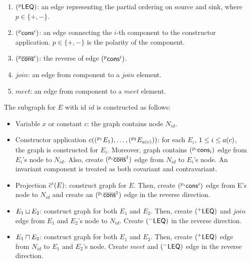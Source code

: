 \begin{enumerate}
\item $(^{p}\mathsf{LEQ})$: an edge representing the partial ordering
on source and sink, where $p\in \{+,-\}$.

\item $(^{p}\textsf{cons}^{i})$: an edge connecting the $i$-th component
to the constructor application. $p\in \{+,-\}$ is the polarity of the
component.

\item $(^{p}\overline{\textsf{cons}}^{i})$: the reverse of edge
$(^{p}\textsf{cons}^{i})$.

\item $\mathit{join}$: an edge from component to a $\mathit{join}$ element.

\item $\mathit{meet}$: an edge from component to a $\mathit{meet}$ element.

\end{enumerate}

The subgraph for $E$ with id $id$ is constructed as follows:

\begin{itemize}
\item Variable $x$ or constant $c$: the graph contains node $N_{id}$. 

\item Constructor application $c((^{p_1}E_1), \dots,
(^{p_2}E_{a(c)}))$: for each $E_i$, $1\leq i \leq a(c)$,
the graph is constructed for $E_i$. Moreover, graph contains
$(^{p_i}\textsf{cons}_i)$ edge from $E_i$'s node to $N_{id}$. 
Also, create
$(^{p_i}\overline{\textsf{cons}}^{1})$ edge from $N_{id}$ to $E_i$'s node.
An invariant
component is treated as both covariant and contravariant.

\item Projection $\overline{c}^{i}(E)$: construct graph for $E$. Then, create
$(^{p_i}\textsf{cons}^{i})$ edge from E's node to $N_{id}$ and create an
$(^{p_i}\overline{\textsf{cons}}^{1})$ edge in the reverse direction.

\item $E_1\sqcup E_2$: construct graph for both $E_1$ and $E_2$. Then,
create $(^{+}\mathsf{LEQ})$ and $join$ edge from $E_1$ and $E_2$'s node to
$N_{id}$. Create $(^{-}\mathsf{LEQ})$ in the reverse direction.

\item $E_1\sqcap E_2$: construct graph for both $E_1$ and $E_2$. Then,
create $(^{+}\mathsf{LEQ})$ edge from $N_{id}$ to $E_1$ and $E_2$'s
node. Create $meet$ and $(^{-}\mathsf{LEQ})$ edge in the reverse
direction.
\end{itemize}

